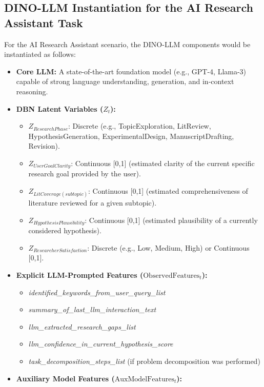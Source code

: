 \documentclass[11pt]{article}
\begin{document}
\subsection{DINO-LLM Instantiation for the AI Research Assistant Task}
\label{ssec:case_study_instantiation}
For the AI Research Assistant scenario, the DINO-LLM components would be instantiated as follows:
\begin{itemize}
    \item \textbf{Core LLM:} A state-of-the-art foundation model (e.g., GPT-4, Llama-3) capable of strong language understanding, generation, and in-context reasoning.
    \item \textbf{DBN Latent Variables ($Z_t$):}
    \begin{itemize}
        \item $Z_{ResearchPhase}$: Discrete (e.g., TopicExploration, LitReview, HypothesisGeneration, ExperimentalDesign, ManuscriptDrafting, Revision).
        \item $Z_{UserGoalClarity}$: Continuous [0,1] (estimated clarity of the current specific research goal provided by the user).
        \item $Z_{LitCoverage(subtopic)}$: Continuous [0,1] (estimated comprehensiveness of literature reviewed for a given subtopic).
        \item $Z_{HypothesisPlausibility}$: Continuous [0,1] (estimated plausibility of a currently considered hypothesis).
        \item $Z_{ResearcherSatisfaction}$: Discrete (e.g., Low, Medium, High) or Continuous [0,1].
    \end{itemize}
    \item \textbf{Explicit LLM-Prompted Features ($\text{ObservedFeatures}_t$):}
    \begin{itemize}
        \item \emph{identified_keywords_from_user_query_list}
        \item \emph{summary_of_last_llm_interaction_text}
        \item \emph{llm_extracted_research_gaps_list}
        \item \emph{llm_confidence_in_current_hypothesis_score}
        \item \emph{task_decomposition_steps_list} (if problem decomposition was performed)
    \end{itemize}
    \item \textbf{Auxiliary Model Features ($\text{AuxModelFeatures}_t$):}
    \begin{itemize}

\end{itemize}
\end{itemize}
\end{document}
